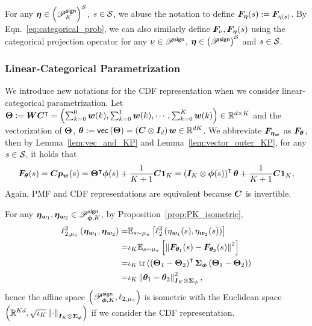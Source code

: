 For any ${\bm{\eta}}\in\left({{\mathscr{P}}^{\mathsf{sign}}_K}\right)^{\mathcal{S}}$, $s\in{\mathcal{S}}$, we abuse the notation to define ${\bm{F}}_{\bm{\eta}}(s):={\bm{F}}_{\eta(s)}$.
By Eqn.~\eqref{eq:categorical_prob}, we can also similarly define ${\bm{F}}_\nu, {\bm{F}}_{\bm{\eta}}(s)$ using the categorical projection operator for any $\nu\in {\mathscr{P}}^{\mathsf{sign}}$, $\bm{\eta}\in \left({{\mathscr{P}}^{\mathsf{sign}}}\right)^{{\mathcal{S}}}$ and $s\in{\mathcal{S}}$.

\subsubsection{Linear-Categorical Parametrization}
We introduce new notations for the CDF representation when we consider linear-categorical parametrization.
Let ${\bm{\Theta}}:={\bm{W}} {\bm{C}}^{\intercal}=\left({\sum_{k=0}^0{\bm{w}}(k), \sum_{k=0}^1{\bm{w}}(k), \cdots,\sum_{k=0}^K{\bm{w}}(k)}\right)\in{\mathbb R}^{d\times K}$ and the vectorization of ${\bm{\Theta}}$, ${\bm{\theta}}:=\mathsf{vec}\left({{\bm{\Theta}}}\right)=\left({{\bm{C}}\otimes{\bm{I}}_d}\right){\bm{w}}\in{\mathbb R}^{dK}$.
We abbreviate ${\bm{F}}_{\bm{\eta}_{\bm{w}}}$ as ${\bm{F}}_{{\bm{\theta}}}$, then by Lemma~\ref{lem:vec_and_KP} and Lemma~\ref{lem:vector_outer_KP}, for any $s\in{\mathcal{S}}$, it holds that
\begin{equation}\label{eq:CDF_linear_parametrization}
    {\bm{F}}_{{\bm{\theta}}}(s)={\bm{C}}{\bm{p}}_{{\bm{w}}}(s)={\bm{\Theta}}^{\intercal}{\bm{\phi}}(s)+\frac{1}{K+1}{\bm{C}}\bm{1}_{K}=\left({{\bm{I}}_K\otimes{\bm{\phi}}(s)}\right)^{\intercal}{\bm{\theta}}+\frac{1}{K+1}{\bm{C}}\bm{1}_{K},
\end{equation}
Again, PMF and CDF representations are equivalent because ${\bm{C}}$ is invertible.

For any $\bm{\eta}_{{\bm{w}}_1},\bm{\eta}_{{\bm{w}}_2}\in{\mathscr{P}}^{\mathsf{sign}}_{{\bm{\phi}},K}$, by Proposition~\ref{prop:PK_isometric},
\begin{equation}\label{eq:CDF_target_function}
    \begin{aligned}
    \ell_{2,\mu_{\pi}}^2\left({\bm{\eta}_{{\bm{w}}_1},\bm{\eta}_{{\bm{w}}_2}}\right)=&{\mathbb E}_{s\sim\mu_\pi}\left[{\ell_{2}^2\left({\eta_{{\bm{w}}_1}(s),\eta_{{\bm{w}}_2}(s)}\right)}\right]\\
    =&\iota_K{\mathbb E}_{s\sim\mu_\pi}\left[{\left\|{{\bm{F}}_{{\bm{\theta}}_1}(s)-{\bm{F}}_{{\bm{\theta}}_2}(s)}\right\|^2}\right]\\
    =&\iota_K\operatorname{tr}\left({\left({{\bm{\Theta}}_1-{\bm{\Theta}}_2}\right)^{\intercal}{\bm{\Sigma}}_{{\bm{\phi}}}\left({{\bm{\Theta}}_1-{\bm{\Theta}}_2}\right)}\right) \\
    =&\iota_K\left\|{{\bm{\theta}}_1-{\bm{\theta}}_2}\right\|^2_{{\bm{I}}_K\otimes{\bm{\Sigma}}_{{\bm{\phi}}}},
\end{aligned}
\end{equation}
hence the affine space $\left({{\mathscr{P}}^{\mathsf{sign}}_{{\bm{\phi}},K}, \ell_{2,\mu_{\pi}}}\right)$ is isometric with the Euclidean space $\left({{\mathbb R}^{Kd}, \sqrt{\iota_K}\left\|{\cdot}\right\|_{{\bm{I}}_K\otimes{\bm{\Sigma}}_{{\bm{\phi}}}}}\right)$ if we consider the CDF representation.


